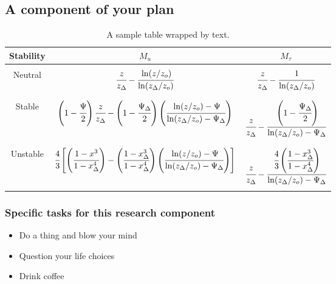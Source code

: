 \subsection{A component of your plan}

% 


\begin{table}
\label{table1}
\caption{A sample table wrapped by text.}
\begin{center}
\vspace{-10pt}
\scriptsize
\begin{tabular}{  c  c  c  }
\hline
\hline
Stability & $M_u$ & $M_{\tau}$ \\
\hline\hline\\
Neutral & $\cfrac{z}{z_\Delta} - \cfrac{\ln(z/z_o)}{\ln(z_\Delta/z_o)}$ & $\cfrac{z}{z_\Delta} - \cfrac{1}{\ln(z_\Delta/z_o)}$\\\\
\hline \\
Stable & $\left(1 - \cfrac{\Psi}{2}\right)\cfrac{z}{z_\Delta} - \left(1 - \cfrac{\Psi_\Delta}{2}\right)
\left(\cfrac{\ln(z/z_o)-\Psi}{\ln(z_\Delta/z_o)- \Psi_\Delta}\right)$ & $\cfrac{z}{z_\Delta} - \cfrac{\left(1 - \cfrac{\Psi_\Delta}{2}\right)}{\ln(z_\Delta/z_o) - \Psi_\Delta}$\\\\
\hline \\
Unstable & $\cfrac{4}{3}\left[\left(\cfrac{1-x^3}{1-x_{\Delta}^{4}}\right) -  \left(\cfrac{1-x_{\Delta}^3}{1 - x_{\Delta}^{4}}\right)\left(\cfrac{\ln(z/z_o)-\Psi}{\ln(z_\Delta/z_o)- \Psi_\Delta}\right)\right]$ & $\cfrac{z}{z_\Delta} - \cfrac{\cfrac{4}{3}\left(\cfrac{1-x_{\Delta}^3}{1 - x_{\Delta}^{4}}\right)}{\ln(z_\Delta/z_o) - \Psi_\Delta}$\\\\
\hline
\hline
\end{tabular}
\end{center}
\end{table}



\subsubsection{Specific tasks for this research component}
\begin{itemize}
\setlength\itemsep{0em}
\item Do a thing and blow your mind
\item Question your life choices
\item Drink coffee
\end{itemize}

